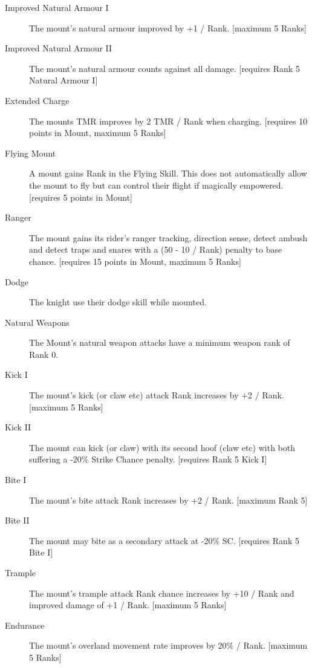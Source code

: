 \documentclass[a4paper]{article}
\begin{document}
\begin{multicols*}{3}
\begin{description}
\item[Improved Natural Armour I] The mount's natural armour improved
  by +1 / Rank.  [maximum 5 Ranks]

\item[Improved Natural Armour II] The mount's natural armour counts
  against all damage.  [requires Rank 5 Natural Armour I]

\item[Extended Charge] The mounts TMR improves by 2 TMR / Rank when
  charging.  [requires 10 points in Mount, maximum 5 Ranks]

\item[Flying Mount] A mount gains Rank in the Flying Skill.  This does
  not automatically allow the mount to fly but can control their
  flight if magically empowered.  [requires 5 points in Mount]

\item[Ranger] The mount gains its rider's ranger tracking, direction
  sense, detect ambush and detect traps and snares with a (50 - 10 /
  Rank) penalty to base chance.  [requires 15 points in Mount, maximum
    5 Ranks]

\item[Dodge] The knight use their dodge skill while mounted.

\item[Natural Weapons] The Mount's natural weapon attacks have a
  minimum weapon rank of Rank 0.

\item[Kick I] The mount's kick (or claw etc) attack Rank increases by
  +2 / Rank.  [maximum 5 Ranks]

\item[Kick II] The mount can kick (or claw) with its second hoof (claw
  etc) with both suffering a -20\% Strike Chance penalty.  [requires
    Rank 5 Kick I]

\item[Bite I] The mount's bite attack Rank increases by +2 / Rank.
  [maximum Rank 5]

\item[Bite II] The mount may bite as a secondary attack at -20\%
  SC. [requires Rank 5 Bite I]

\item[Trample] The mount's trample attack Rank chance increases by +10
  / Rank and improved damage of +1 / Rank. [maximum 5 Ranks]

\item[Endurance] The mount's overland movement rate improves by 20\% /
  Rank.  [maximum 5 Ranks]


\end{description}
\end{multicols*}
\end{document}
